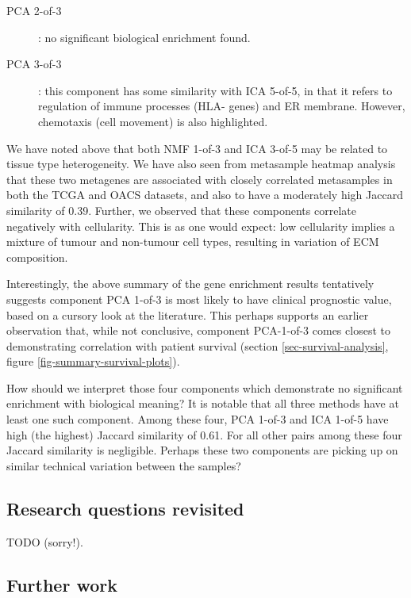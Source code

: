 \documentclass[draft, tikz, 12pt,a4paper,oneside,fleqn]{article}
\begin{document}
\begin{description}
%
\item[PCA 2-of-3]: no significant biological enrichment found.
%
\item[PCA 3-of-3]: this component has some similarity with ICA 5-of-5, in that it refers to regulation of immune processes (HLA- genes) and ER membrane.   However, chemotaxis (cell movement) is also highlighted.
\end{description}

We have noted above that both NMF 1-of-3 and ICA 3-of-5 may be related to tissue type heterogeneity.  We have also seen from metasample heatmap analysis that these two metagenes are associated with closely correlated metasamples in both the TCGA and OACS datasets, and also to have a moderately high Jaccard similarity of 0.39.  Further, we observed that these components correlate negatively with cellularity.  This is as one would expect: low cellularity implies a mixture of tumour and non-tumour cell types, resulting in variation of ECM composition. 

Interestingly, the above summary of the gene enrichment results tentatively suggests component PCA 1-of-3 is most likely to have clinical prognostic value, based on a cursory look at the literature.  This perhaps supports an earlier observation that, while not conclusive, component PCA-1-of-3 comes closest to demonstrating correlation with patient survival (section \ref{sec-survival-analysis}, figure \ref{fig-summary-survival-plots}).

How should we interpret those four components which demonstrate no significant enrichment with biological meaning?  It is notable that all three methods have at least one such component.  Among these four, PCA 1-of-3 and ICA 1-of-5 have high (the highest) Jaccard similarity of 0.61.   For all other pairs among these four Jaccard similarity is negligible.  Perhaps these two components are picking up on similar technical variation between the samples?   

\subsection{Research questions revisited}

TODO (sorry!).


\subsection{Further work}
\end{document}
